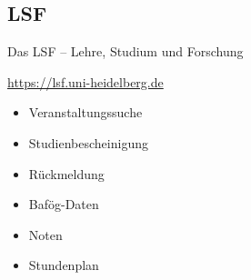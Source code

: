 \subsection{LSF}
\begin{frame}{Das LSF -- Lehre, Studium und Forschung}

    \large \url{https://lsf.uni-heidelberg.de} \\
    \begin{minipage}[t]{0.515\textwidth}
        \begin{itemize}
            \item{Veranstaltungssuche}
            \item{Studienbescheinigung}
            \item{Rückmeldung}
            \item{Bafög-Daten}
            \item{Noten}
            \item{Stundenplan}
        \end{itemize}
    \end{minipage}
    \begin{minipage}[t]{0.475\textwidth}
        \vspace{0.1cm}
        \begin{center}
        \end{center}
    \end{minipage}
\end{frame}

